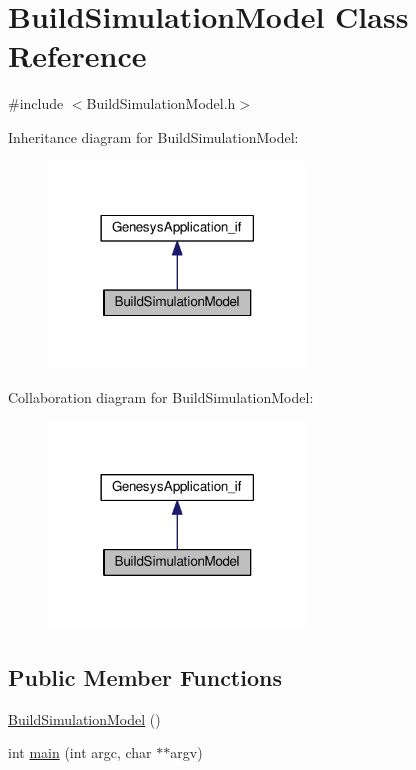 \hypertarget{class_build_simulation_model}{\section{Build\-Simulation\-Model Class Reference}
\label{class_build_simulation_model}
}


{\ttfamily \#include $<$Build\-Simulation\-Model.\-h$>$}



Inheritance diagram for Build\-Simulation\-Model\-:
\nopagebreak
\begin{figure}[H]
\begin{center}
\leavevmode
\includegraphics[width=194pt]{class_build_simulation_model__inherit__graph}
\end{center}
\end{figure}


Collaboration diagram for Build\-Simulation\-Model\-:
\nopagebreak
\begin{figure}[H]
\begin{center}
\leavevmode
\includegraphics[width=194pt]{class_build_simulation_model__coll__graph}
\end{center}
\end{figure}
\subsection*{Public Member Functions}
\begin{DoxyCompactItemize}
\item 
\hyperlink{class_build_simulation_model_a477872592a89845e00cfbc7b6063bb21}{Build\-Simulation\-Model} ()
\item 
int \hyperlink{class_build_simulation_model_a8c50f55d7293860e5e7bc7e7e74f8d4a}{main} (int argc, char $\ast$$\ast$argv)
\end{DoxyCompactItemize}


